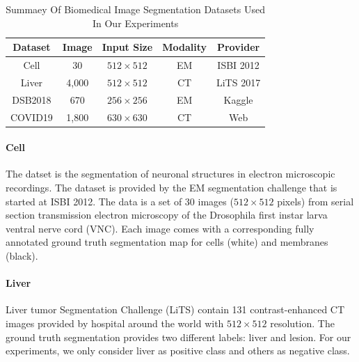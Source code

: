 \documentclass{ieeeaccess}
\begin{document}
\begin{table}[htbp]
    \vspace{-2mm}
    \begin{center}\small
    \label{dataset-table}
    \begin{tabular}{ccccc}
      
    \toprule
    Dataset & Image & Input Size & Modality & Provider\\
    \midrule
    Cell & 30 & $512\times 512$  & EM      & ISBI 2012\cite{isbicell}   \\
    Liver    & 4,000 & $512\times 512$       & CT     & LiTS 2017\cite{liver}  \\
    DSB2018      & 670 & $256\times 256$      & EM      & Kaggle\cite{dsb2018} \\
    COVID19         & 1,800 & $630\times 630$     & CT     & Web\cite{covid19,covid19_2}  \\
  \bottomrule    
    \end{tabular}
    \caption{Summaey Of Biomedical Image Segmentation Datasets Used In Our Experiments}
  \end{center}
    \vspace{-4mm}
\end{table}
  


\paragraph{Cell}
The datset is the segmentation of neuronal structures in electron microscopic recordings.
The dataset is provided by the EM segmentation challenge\cite{isbicell} that is started at ISBI 2012.
The data is a set of 30 images ($512\times 512$ pixels) from serial section transmission electron
microscopy of the Drosophila first instar larva ventral nerve cord (VNC). Each image comes with a corresponding fully annotated ground truth segmentation
map for cells (white) and membranes (black).

\paragraph{Liver}
Liver tumor Segmentation Challenge (LiTS)\cite{liver} contain 131 contrast-enhanced CT images provided by hospital around the world with \(512 \times 512\) resolution.
The ground truth segmentation provides two different labels: liver and lesion. For our experiments,
we only consider liver as positive class and others as negative class.
\end{document}
